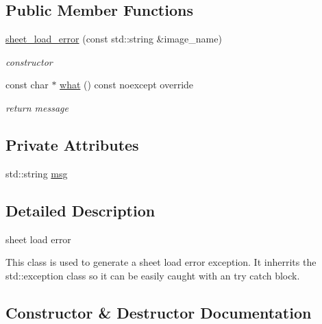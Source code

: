 \subsection*{Public Member Functions}
\begin{DoxyCompactItemize}
\item 
\hyperlink{classsheet__load__error_a80642b59420e3b58c1c5e980cf702c41}{sheet\+\_\+load\+\_\+error} (const std\+::string \&image\+\_\+name)
\begin{DoxyCompactList}\small\item\em constructor \end{DoxyCompactList}\item 
const char $\ast$ \hyperlink{classsheet__load__error_a57dd1a273a0720e58ec0eb667d0c85aa}{what} () const noexcept override
\begin{DoxyCompactList}\small\item\em return message \end{DoxyCompactList}\end{DoxyCompactItemize}
\subsection*{Private Attributes}
\begin{DoxyCompactItemize}
\item 
std\+::string \hyperlink{classsheet__load__error_ace61b8fa1d457fc96a3edd2e354f0b1a}{msg}
\end{DoxyCompactItemize}


\subsection{Detailed Description}
sheet load error 

This class is used to generate a sheet load error exception. It inherrits the std\+::exception class so it can be easily caught with an try catch block. 

\subsection{Constructor \& Destructor Documentation}
\mbox{\label{classsheet__load__error_a80642b59420e3b58c1c5e980cf702c41}} 
